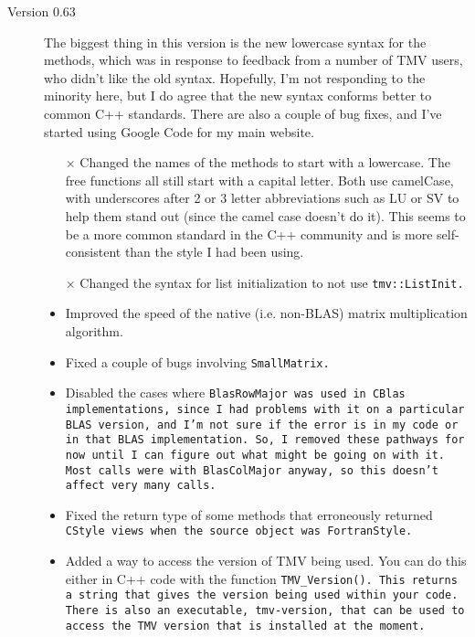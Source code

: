 \begin{description}
\item[Version 0.63]
The biggest thing in this version is the new lowercase syntax for the
methods, which was in response to feedback from a number of TMV users, 
who didn't like the old syntax.  Hopefully, I'm not responding to the 
minority here, but I do agree that the new syntax conforms better
to common C++ standards.  There are also a couple of bug fixes, and I've
started using Google Code for my main website.

\begin{itemize}

\item[$\times$]
Changed the names of the methods to start with a lowercase.
The free functions all still start with a capital letter.
Both use camelCase, with underscores after 2 or 3 letter abbreviations
such as LU or SV to help them stand out (since the camel case doesn't do it).
This seems to be a more common standard in the C++ community and is more
self-consistent than the style I had been using.

\item[$\times$]
Changed the syntax for list initialization to not use \tt{tmv::ListInit}.

\item
Improved the speed of the native (i.e. non-BLAS) matrix multiplication algorithm.

\item
Fixed a couple of bugs involving \tt{SmallMatrix}.  

\item
Disabled the cases where \tt{BlasRowMajor} was used in CBlas implementations, 
since I had problems
with it on a particular BLAS version, and I'm not sure if the error
is in my code or in that BLAS implementation.
So, I removed these pathways for now until I can figure out what might
be going on with it.  Most calls were with \tt{BlasColMajor} anyway, so this
doesn't affect very many calls.

\item
Fixed the return type of some methods that erroneously returned \tt{CStyle}
views when the source object was \tt{FortranStyle}.

\item
Added a way to access the version of TMV being used.
You can do this either in C++ code with the function \tt{TMV\_Version()}.
This returns a string that gives the version being used within your code.
There is also an executable, \tt{tmv-version}, that can be used to access
the TMV version that is installed at the moment.


\end{itemize}
\end{description}
